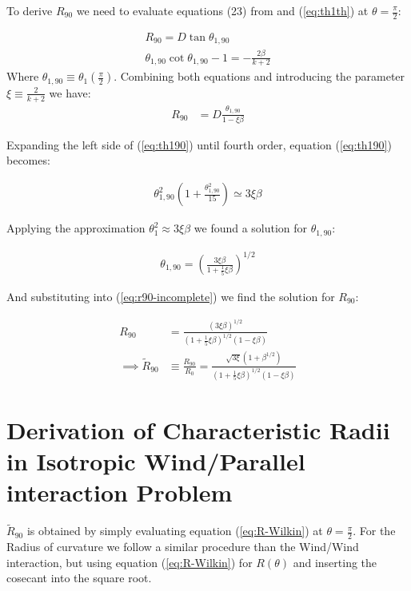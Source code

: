 To derive $R_{90}$ we need to evaluate equations (23) from \CRW{} and (\ref{eq:th1th})
at $\theta=\frac{\pi}{2}$:

\begin{align}
R_{90} = D\tan\theta_{1,90} \\
\theta_{1,90}\cot\theta_{1,90} -1 = -\frac{2\beta}{k+2} \label{eq:th190}
\end{align}
Where $\theta_{1,90}\equiv \theta_1(\frac{\pi}{2})$. Combining both equations and  introducing
the parameter $\xi\equiv \frac{2}{k+2}$ we have:
\begin{align}
R_{90} &= D\frac{\theta_{1,90}}{1-\xi\beta} \label{eq:r90-incomplete}
\end{align}

Expanding the left side of (\ref{eq:th190}) until fourth order, equation (\ref{eq:th190})
becomes:

\begin{align}
\theta_{1,90}^2\left(1+\frac{\theta_{1,90}^2}{15}\right) \simeq 3\xi\beta
\end{align}

Applying the approximation $\theta_1^2 \approx 3\xi\beta$ we found a solution
for $\theta_{1,90}$:

\begin{align}
\theta_{1,90} = \left(\frac{3\xi\beta}{1+\frac{1}{5}\xi\beta}\right)^{1/2}
\end{align}

And substituting into (\ref{eq:r90-incomplete}) we find the solution for $R_{90}$:

\begin{align}
R_{90} &= \frac{\left(3\xi\beta\right)^{1/2}}{\left(1+\frac{1}{5}\xi\beta\right)^{1/2}
\left(1-\xi\beta\right)} \\
\implies \tilde{R}_{90} &\equiv \frac{R_{90}}{R_0} = \frac{\sqrt{3\xi}\left(1+\beta^{1/2}\right)}
{\left(1+\frac{1}{5}\xi\beta\right)^{1/2}\left(1-\xi\beta\right)}
\end{align}

\section{Derivation of Characteristic Radii in Isotropic Wind/Parallel interaction Problem}
\label{app:ch-rad-Wilkin}

$\tilde{R}_{90}$ is obtained by simply evaluating equation (\ref{eq:R-Wilkin}) at $\theta=\frac{\pi}{2}$.
For the Radius of curvature we follow a similar procedure than the Wind/Wind interaction, but using equation
(\ref{eq:R-Wilkin}) for $R(\theta)$ and inserting the cosecant into the square root.

